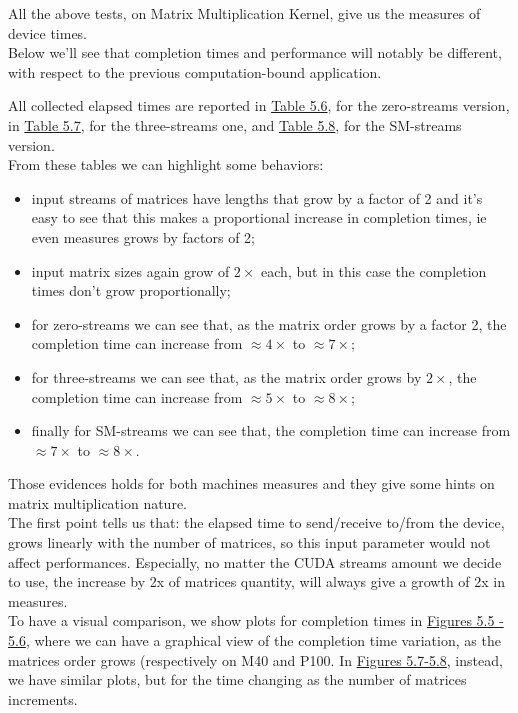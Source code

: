 All the above tests, on Matrix Multiplication Kernel, give us the measures of device times.\\
Below we'll see that completion times and performance will notably be different, with respect to the previous computation-bound application.

All collected elapsed times are reported in \hyperref[tab:matvgszero]{Table 5.6}, for the zero-streams version, in \hyperref[tab:matvgsThree]{Table 5.7}, for the three-streams one, and \hyperref[tab:matvgsSM]{Table 5.8}, for the SM-streams version.\\
From these tables we can highlight some behaviors:
\begin{itemize}
	\item input streams of matrices have lengths that grow by a factor of 2 and it's easy to see that this makes a proportional increase in completion times, ie even measures grows by factors of 2;
	
	\item input matrix sizes again grow of \(2\times\) each, but in this case the completion times don't grow proportionally;
	
	\item for zero-streams we can see that, as the matrix order grows by a factor 2, the completion time can increase from \(\approx4\times\) to \(\approx7\times\); 
	
	\item for three-streams we can see that, as the matrix order grows by \(2\times\), the completion time can increase from \(\approx5\times\) to \(\approx8\times\); 
	
	\item finally for SM-streams we can see that, the completion time can increase from \(\approx7\times\) to \(\approx8\times\).
\end{itemize}
Those evidences holds for both machines measures and they give some hints on matrix multiplication nature.\\
The first point tells us that: the elapsed time to send/receive to/from the device, grows linearly with the number of matrices, so this input parameter would not affect performances. Especially, no matter the CUDA streams amount we decide to use, the increase by 2x of matrices quantity, will always give a growth of 2x in measures.\\
To have a visual comparison, we show plots for completion times in \hyperref[fig:matcompsize]{Figures 5.5 - 5.6}, where we can have a graphical view of the completion time variation, as the matrices order grows (respectively on M40 and P100. In \hyperref[fig:matcompnum]{Figures 5.7-5.8}, instead, we have similar plots, but for the time changing as the number of matrices increments.
